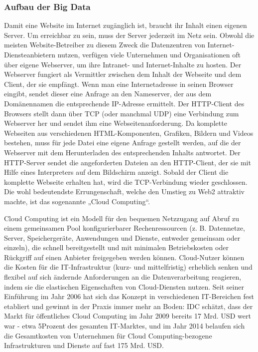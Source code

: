 \subsubsection{Aufbau der Big Data}
Damit eine Website im Internet zugänglich ist, braucht ihr Inhalt einen eigenen Server. 
Um erreichbar zu sein, muss der Server jederzeit im Netz sein. 
Obwohl die meisten Website-Betreiber zu diesem Zweck die Datenzentren von Internet-Diensteanbietern nutzen, verfügen viele Unternehmen und Organisationen oft über eigene Webserver, um ihre Intranet- und Internet-Inhalte zu hosten. 
Der Webserver fungiert als Vermittler zwischen dem Inhalt der Webseite und dem Client, der sie empfängt. 
Wenn man eine Internetadresse in seinen Browser eingibt, sendet dieser eine Anfrage an den Nameserver, der aus dem Domänennamen die entsprechende IP-Adresse ermittelt. 
Der HTTP-Client des Browsers stellt dann über TCP (oder manchmal UDP) eine Verbindung zum Webserver her und sendet ihm eine Webseitenanforderung. 
Da komplette Webseiten aus verschiedenen HTML-Komponenten, Grafiken, Bildern und Videos bestehen, muss für jede Datei eine eigene Anfrage gestellt werden, auf die der Webserver mit dem Herunterladen des entsprechenden Inhalts antwortet. 
Der HTTP-Server sendet die angeforderten Dateien an den HTTP-Client, der sie mit Hilfe eines Interpreters auf dem Bildschirm anzeigt. Sobald der Client die komplette Webseite erhalten hat, wird die TCP-Verbindung wieder geschlossen. 
Die wohl bedeutendste Errungenschaft, welche den Umstieg zu Web2 attraktiv machte, ist das sogenannte „Cloud Computing“.

Cloud Computing ist ein Modell für den bequemen Netzzugang auf Abruf zu einem gemeinsamen Pool konfigurierbarer Rechenressourcen (z. B. Datennetze, Server, Speichergeräte, Anwendungen und Dienste, entweder gemeinsam oder einzeln), die schnell bereitgestellt und mit minimalen Betriebskosten oder Rückgriff auf einen Anbieter freigegeben werden können.
Cloud-Nutzer können die Kosten für die IT-Infrastruktur (kurz- und mittelfristig) erheblich senken und flexibel auf sich ändernde Anforderungen an die Datenverarbeitung reagieren, indem sie die elastischen Eigenschaften von Cloud-Diensten nutzen.
Seit seiner Einführung im Jahr 2006 hat sich das Konzept in verschiedenen IT-Bereichen fest etabliert und gewinnt in der Praxis immer mehr an Boden: IDC schätzt, dass der Markt für öffentliches Cloud Computing im Jahr 2009 bereits 17 Mrd. USD wert war - etwa 5Prozent des gesamten IT-Marktes, und im Jahr 2014 belaufen sich die Gesamtkosten von Unternehmen für Cloud Computing-bezogene Infrastrukturen und Dienste auf fast 175 Mrd. USD.


